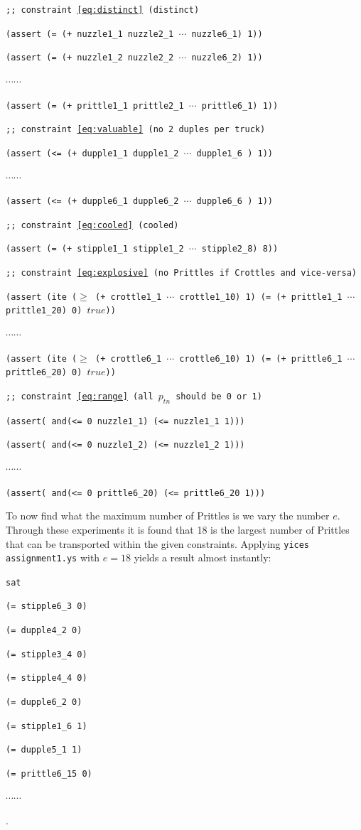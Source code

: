 \documentclass[12pt]{article}
\begin{document}
{\tt ;; constraint~\ref{eq:distinct} (distinct)}

{\tt (assert (= (+ nuzzle1\_1 nuzzle2\_1 $\cdots$ nuzzle6\_1) 1))}

{\tt (assert (= (+ nuzzle1\_2 nuzzle2\_2 $\cdots$ nuzzle6\_2) 1))}

$\cdots \cdots$

{\tt (assert (= (+ prittle1\_1 prittle2\_1 $\cdots$ prittle6\_1) 1))}

{\tt ;; constraint~\ref{eq:valuable} (no 2 duples per truck)}

{\tt (assert (<= (+ dupple1\_1 dupple1\_2 $\cdots$ dupple1\_6 ) 1))}

$\cdots \cdots$

{\tt (assert (<= (+ dupple6\_1 dupple6\_2 $\cdots$ dupple6\_6 ) 1))}

{\tt ;; constraint~\ref{eq:cooled} (cooled)}

{\tt (assert (= (+ stipple1\_1 stipple1\_2 $\cdots$ stipple2\_8) 8))}

{\tt ;; constraint~\ref{eq:explosive} (no Prittles if Crottles and vice-versa)}

{\tt (assert (ite 	($\geq$ (+ crottle1\_1 $\cdots$ crottle1\_10) 1) 
	 		(= (+ prittle1\_1 $\cdots$ prittle1\_20) 0) $true$))}

$\cdots \cdots$

{\tt (assert (ite 	($\geq$ (+ crottle6\_1 $\cdots$ crottle6\_10) 1) 
	 		(= (+ prittle6\_1 $\cdots$ prittle6\_20) 0) $true$))}

{\tt ;; constraint~\ref{eq:range} (all $p_{tn}$ should be 0 or 1)}

{\tt (assert( and(<= 0 nuzzle1\_1) (<= nuzzle1\_1 1)))}

{\tt (assert( and(<= 0 nuzzle1\_2) (<= nuzzle1\_2 1)))}

$\cdots \cdots$

{\tt (assert( and(<= 0 prittle6\_20) (<= prittle6\_20 1)))}

To now find what the maximum number of Prittles is we vary the number $e$. 
Through these experiments it is found that 18 is the largest number of Prittles
that can be transported within the given constraints.
Applying {\tt yices assignment1.ys} with $e=18$ yields a result almost 
instantly:

{\footnotesize

{\tt sat }

{\tt (= stipple6\_3 0)}

{\tt (= dupple4\_2 0)}

{\tt (= stipple3\_4 0)}

{\tt (= stipple4\_4 0)}

{\tt (= dupple6\_2 0)}

{\tt (= stipple1\_6 1)}

{\tt (= dupple5\_1 1)}

{\tt (= prittle6\_15 0)}

$\cdots \cdots$ }.
\end{document}
